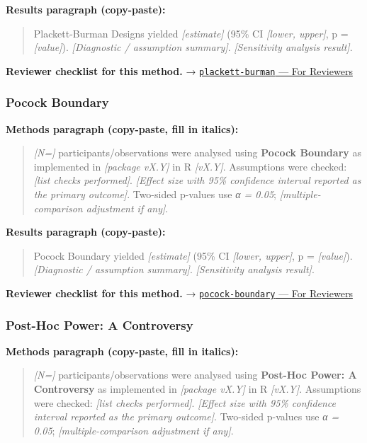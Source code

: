\documentclass[
]{article}
\begin{document}
\textbf{Results paragraph (copy-paste):}

\begin{quote}
Plackett-Burman Designs yielded \emph{{[}estimate{]}} (95\% CI
\emph{{[}lower, upper{]}}, p = \emph{{[}value{]}}). \emph{{[}Diagnostic
/ assumption summary{]}}. \emph{{[}Sensitivity analysis result{]}}.
\end{quote}

\textbf{Reviewer checklist for this method.} →
\href{../chapters/16-design/plackett-burman.Rmd\#for-reviewers}{\texttt{plackett-burman}
--- For Reviewers}

\subsubsection{Pocock Boundary}\label{pocock-boundary}

\textbf{Methods paragraph (copy-paste, fill in italics):}

\begin{quote}
\emph{{[}N={]}} participants/observations were analysed using
\textbf{Pocock Boundary} as implemented in \emph{{[}package vX.Y{]}} in
R \emph{{[}vX.Y{]}}. Assumptions were checked: \emph{{[}list checks
performed{]}}. \emph{{[}Effect size with 95\% confidence interval
reported as the primary outcome{]}}. Two-sided p-values use \emph{α =
0.05}; \emph{{[}multiple-comparison adjustment if any{]}}.
\end{quote}

\textbf{Results paragraph (copy-paste):}

\begin{quote}
Pocock Boundary yielded \emph{{[}estimate{]}} (95\% CI \emph{{[}lower,
upper{]}}, p = \emph{{[}value{]}}). \emph{{[}Diagnostic / assumption
summary{]}}. \emph{{[}Sensitivity analysis result{]}}.
\end{quote}

\textbf{Reviewer checklist for this method.} →
\href{../chapters/14-clinical/pocock-boundary.Rmd\#for-reviewers}{\texttt{pocock-boundary}
--- For Reviewers}

\subsubsection{Post-Hoc Power: A
Controversy}\label{post-hoc-power-a-controversy}

\textbf{Methods paragraph (copy-paste, fill in italics):}

\begin{quote}
\emph{{[}N={]}} participants/observations were analysed using
\textbf{Post-Hoc Power: A Controversy} as implemented in
\emph{{[}package vX.Y{]}} in R \emph{{[}vX.Y{]}}. Assumptions were
checked: \emph{{[}list checks performed{]}}. \emph{{[}Effect size with
95\% confidence interval reported as the primary outcome{]}}. Two-sided
p-values use \emph{α = 0.05}; \emph{{[}multiple-comparison adjustment if
any{]}}.
\end{quote}
\end{document}
